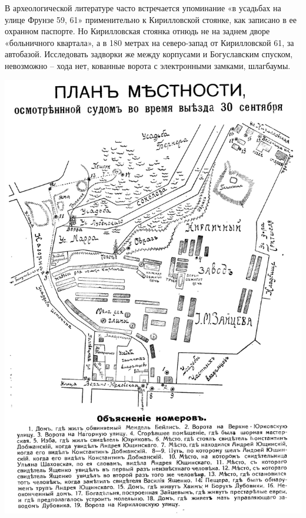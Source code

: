 В археологической литературе часто встречается упоминание «в усадьбах на улице Фрунзе 59, 61» применительно к Кирилловской стоянке, как записано в ее охранном паспорте. Но Кирилловская стоянка отнюдь не на заднем дворе «больничного квартала», а в 180 метрах на северо-запад от Кирилловской 61, за автобазой. Исследовать задворки же между корпусами и Богуславским спуском, невозможно – хода нет, кованные ворота с электронными замками, шлагбаумы.%

\newpage
\vspace*{\fill}
\begin{center}
\includegraphics[width=\linewidth]{chast-kirvys/beylis/1913-karta.jpg}
\end{center}
\vspace*{\fill}
\newpage

